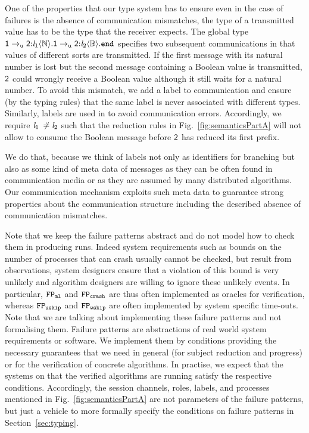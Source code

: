 One of the properties that our type system has to ensure even in the case of failures is the absence of communication mismatches, \ie the type of a transmitted value has to be the type that the receiver expects.
The global type $ \GComU{\Role[1]}{\Role[2]}{\Label_1}{\nat}{\GComU{\Role[1]}{\Role[2]}{\Label_2}{\bool}{\GEnd}} $ specifies two subsequent \unrel communications in that values of different sorts are transmitted.
If the first message with its natural number is lost but the second message containing a Boolean value is transmitted, $ \Role[2] $ could wrongly receive a Boolean value although it still waits for a natural number.
To avoid this mismatch, we add a label to \unrel communication and ensure (by the typing rules) that the same label is never associated with different types.
Similarly, labels are used in \cite{CairesVieira10} to avoid communication errors.
Accordingly, we require $ \Label_1 \nCompL \Label_2 $ such that the reduction rules in Fig.~\ref{fig:semanticsPartA} will not allow to consume the Boolean message before $ \Role[2] $ has reduced its first prefix.

We do that, because we think of labels not only as identifiers for branching but also as some kind of meta data of messages as they can be often found in communication media or as they are assumed by many distributed algorithms.
Our \unrel communication mechanism exploits such meta data to guarantee strong properties about the communication structure including the described absence of communication mismatches.

Note that we keep the failure patterns abstract and do not model how to check them in producing runs.
Indeed system requirements such as bounds on the number of processes that can crash usually cannot be checked, but result from observations, \ie system designers ensure that a violation of this bound is very unlikely and algorithm designers are willing to ignore these unlikely events.
In particular, $ \fpML $ and $ \fpCrash $ are thus often implemented as oracles for verification, whereas \eg $ \fpUSkip $ and $ \fpWSkip $ are often implemented by system specific time-outs.
Note that we are talking about implementing these failure patterns and not formalising them.
Failure patterns are abstractions of real world system requirements or software.
We implement them by conditions providing the necessary guarantees that we need in general (\ie for subject reduction and progress) or for the verification of concrete algorithms.
In practise, we expect that the systems on that the verified algorithms are running satisfy the respective conditions.
Accordingly, the session channels, roles, labels, and processes mentioned in Fig.~\ref{fig:semanticsPartA} are not parameters of the failure patterns, but just a vehicle to more formally specify the conditions on failure patterns in Section~\ref{sec:typing}.

